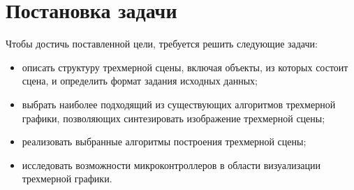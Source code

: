 \chapter*{Постановка задачи}

Чтобы достичь поставленной цели, требуется решить следующие задачи: 
\begin{itemize}
    \item описать структуру трехмерной сцены, включая объекты, из которых состоит сцена, и определить формат задания исходных данных;
    \item выбрать наиболее подходящий из существующих алгоритмов трехмерной графики, позволяющих синтезировать изображение трехмерной сцены;
    \item реализовать выбранные алгоритмы построения трехмерной сцены;
    \item исследовать возможности микроконтроллеров в области визуализации трехмерной графики.
\end{itemize}
